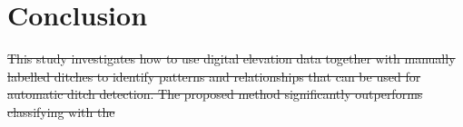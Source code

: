 \documentclass[]{interact}
\theoremstyle{plain}%
\theoremstyle{definition}
\theoremstyle{remark}
\providecommand{\DIFdeltex}[1]{{\protect\color{red}\sout{#1}}}                      %
\providecommand{\DIFaddbegin}{} %
\providecommand{\DIFdelbegin}{} %
\providecommand{\DIFdelend}{} %
\providecommand{\DIFdel}[1]{\texorpdfstring{\DIFdeltex{#1}}{}} %
\begin{document}
\section{Conclusion}

\DIFdelbegin \DIFdel{This study investigates how to use digital elevation data together with manually labelled ditches to identify patterns and relationships that can be used for automatic ditch detection. The proposed method significantly outperforms classifying with the }\DIFdelend %
\DIFaddbegin 
\end{document}
